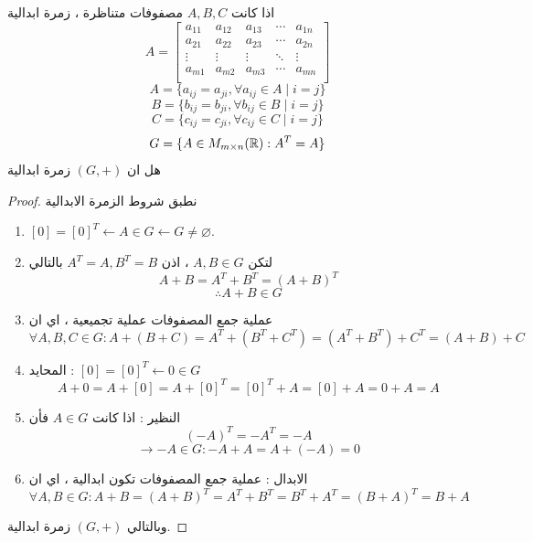 \begin{theorem}
	اذا كانت \(A, B, C\) مصفوفات متناظرة ، زمرة ابدالية
\[
A =
\begin{bmatrix}
	a_{11} & a_{12} & a_{13} & \cdots & a_{1n}\\
	a_{21} & a_{22} & a_{23} & \cdots & a_{2n}\\
	\vdots & \vdots & \vdots & \ddots & \vdots\\
	a_{m1} & a_{m2} & a_{m3} & \cdots & a_{mn}\\
\end{bmatrix}
\]
\[
A = \{a_{ij} = a_{ji}, \forall a_{ij}\in A \mid i = j\}
\]
\[
B = \{b_{ij} = b_{ji}, \forall b_{ij}\in B \mid i = j\}
\]
\[
C = \{c_{ij} = c_{ji}, \forall c_{ij}\in C \mid i = j\}
\]
\[
G = \{A \in M_{m\times n}(\mathbb{R})  : A^T = A\}
\]
هل ان $(G, +)$ زمرة ابدالية 
\end{theorem}
\begin{proof}
	نطبق شروط الزمرة الابدالية
	\begin{enumerate}[label=\textbf{\xslalph*)}, leftmargin=*]
		\item $[0]=[0]^T \leftarrow A\in G \leftarrow G\neq \varnothing$.
		
		\item لتكن $A, B\in G$ ، اذن $A^T = A, B^T = B$ بالتالي
		\[
		A + B= A^T + B^T = (A+B)^T
		\]
		\[
		\therefore A+B\in G
		\]
		\item عملية جمع المصفوفات عملية تجميعية ، اي ان
		\[
		\forall A, B, C \in G : A+(B+C) = A^T+(B^T+C^T) = (A^T+B^T)+C^T = (A+B)+C
		\]
		\item المحايد : 
		$[0]=[0]^T \leftarrow 0 \in G$
		\[
		A + 0 = A + [0] = A + [0]^T = [0]^T + A = [0] + A = 0  +A = A
		\] 
		\item النظير : اذا كانت $A\in G$ فأن 
		\[
		(-A)^T = -A^T = -A 
		\]
		\[
		\rightarrow -A \in G : -A + A = A+(-A) = 0
		\]
		\item الابدال : عملية جمع المصفوفات تكون ابدالية ، اي ان
		\[
		\forall A, B \in G : A + B = (A + B)^T = A^T + B^T = B^T + A^T = (B+A)^T = B+A
		\]
	\end{enumerate} 
	وبالتالي $(G, +)$ زمرة ابدالية.
\end{proof}


